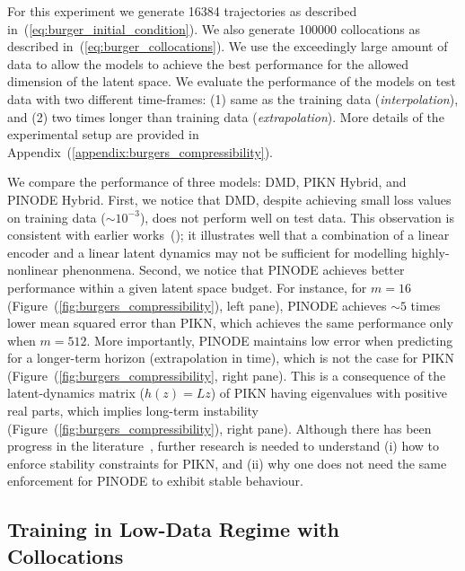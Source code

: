 For this experiment we generate 16384 trajectories as described in~(\ref{eq:burger_initial_condition}). We also generate 100000 collocations as described in~(\ref{eq:burger_collocations}). We use the exceedingly large amount of data to allow the models to achieve the best performance for the allowed dimension of the latent space. We evaluate the performance of the models on test data with two different time-frames: (1) same as the training data (\textit{interpolation}), and (2) two times longer than training data (\textit{extrapolation}). More details of the experimental setup are provided in Appendix~(\ref{appendix:burgers_compressibility}).

We compare the performance of three models: DMD, PIKN Hybrid, and PINODE Hybrid. First, we notice that DMD, despite achieving small loss values on training data ($\sim 10^{-3}$), does not perform well on test data. This observation is consistent with earlier works~(\cite{kalur2021robust,kutz2016dynamic}); it illustrates well that a combination of a linear encoder and a linear latent dynamics may not be sufficient for modelling highly-nonlinear phenonmena. Second, we notice that PINODE achieves better performance within a given latent space budget. For instance, for $m = 16$ (Figure~(\ref{fig:burgers_compressibility}), left pane), PINODE achieves $\sim 5$ times lower mean squared error than PIKN, which achieves the same performance only when $m = 512$. More importantly, PINODE maintains low error when predicting for a longer-term horizon (extrapolation in time), which is not the case for PIKN (Figure~(\ref{fig:burgers_compressibility}, right pane). This is a consequence of the latent-dynamics matrix ($h(z) = Lz$) of PIKN having eigenvalues with positive real parts, which implies long-term instability (Figure~(\ref{fig:burgers_compressibility}), right pane). Although there has been progress in the literature~\cite{kojimalearning}, further research is needed to understand (i) how to enforce stability constraints for PIKN, and (ii) why one does not need the same enforcement for PINODE to exhibit stable behaviour. 

\subsection{Training in Low-Data Regime with Collocations}
\label{sec:data_vs_collocations}

